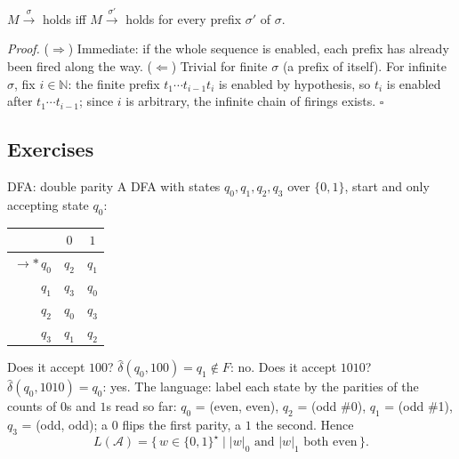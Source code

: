 \begin{proposition}
$M \xrightarrow{\sigma}$ holds iff $M \xrightarrow{\sigma'}$ holds for every prefix $\sigma'$ of $\sigma$.
\end{proposition}

\textit{Proof.} ($\Rightarrow$) Immediate: if the whole sequence is enabled, each prefix has already been fired along the way. ($\Leftarrow$) Trivial for finite $\sigma$ (a prefix of itself). For infinite $\sigma$, fix $i \in \mathbb{N}$: the finite prefix $t_1 \cdots t_{i-1} t_i$ is enabled by hypothesis, so $t_i$ is enabled after $t_1 \cdots t_{i-1}$; since $i$ is arbitrary, the infinite chain of firings exists. \hfill$\square$

\subsection{Exercises}

\begin{examplebox}{DFA: double parity}
A DFA with states $q_0, q_1, q_2, q_3$ over $\{0, 1\}$, start and only accepting state $q_0$:
\begin{center}
\renewcommand{\arraystretch}{1.1}
\begin{tabular}{rcc}
\toprule
 & $0$ & $1$ \\
\midrule
$\to \ast\, q_0$ & $q_2$ & $q_1$ \\
$q_1$ & $q_3$ & $q_0$ \\
$q_2$ & $q_0$ & $q_3$ \\
$q_3$ & $q_1$ & $q_2$ \\
\bottomrule
\end{tabular}
\end{center}
Does it accept $100$? $\hat{\delta}(q_0, 100) = q_1 \notin F$: no. Does it accept $1010$? $\hat{\delta}(q_0, 1010) = q_0$: yes. The language: label each state by the parities of the counts of $0$s and $1$s read so far: $q_0$ = (even, even), $q_2$ = (odd \#0), $q_1$ = (odd \#1), $q_3$ = (odd, odd); a $0$ flips the first parity, a $1$ the second. Hence
\[
  L(\mathcal{A}) = \{\, w \in \{0,1\}^\star \mid |w|_0 \text{ and } |w|_1 \text{ both even} \,\}.
\]
\end{examplebox}

